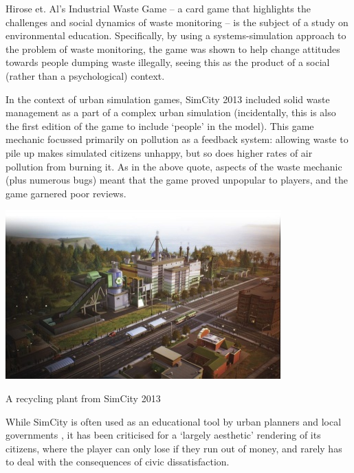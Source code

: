 \documentclass[nofonts,nols,justified,nobib]{tufte-book}
\begin{document}
Hirose et. Al's Industrial Waste Game \cite{hirose_industrial_2004} -- a card game that highlights the challenges and social dynamics of waste monitoring -- is the subject of a study on environmental education. Specifically, by using a systems-simulation approach to the problem of waste monitoring, the game was shown to help change attitudes towards people dumping waste illegally, seeing this as the product of a social (rather than a psychological) context. 

In the context of urban simulation games, SimCity 2013 included solid waste management as a part of a complex urban simulation (incidentally, this is also the first edition of the game to include `people' in the model). This game mechanic focussed primarily on pollution as a feedback system: allowing waste to pile up makes simulated citizens unhappy, but so does higher rates of air pollution from burning it. As in the above quote, aspects of the waste mechanic (plus numerous bugs) meant that the game proved unpopular to players, and the game garnered poor reviews.  

\begin{marginfigure}
\includegraphics[width=\textwidth]{img/1/simcity2013-recycling.jpeg}
\caption{A recycling plant from SimCity 2013 \cite{noauthor_garbage_2013}}
\end{marginfigure}

While SimCity is often used as an educational tool by urban planners and local governments \cite{gaber_simulating_2007, lobo_city_2004}, it has been criticised for a `largely aesthetic' \cite{gaber_simulating_2007} rendering of its citizens, where the player can only lose if they run out of money, and rarely has to deal with the consequences of civic dissatisfaction. 
\end{document}
